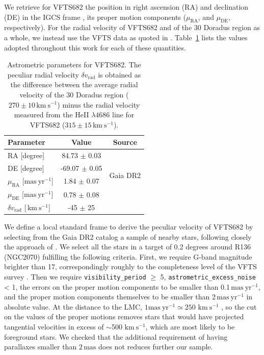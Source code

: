 \documentclass{aa}
\newcommand{\kms}{{\,\mathrm{km\ s^{-1}}}}
\DeclareRobustCommand{\Tabref}[1]{Table~\ref{#1}}
\begin{document}

We retrieve for VFTS682 the position in right ascension (RA) and declination (DE)
in the IGCS frame \cite[][]{brown:18}, its
proper motion components ($\mu_\mathrm{RA}$, and $\mu_\mathrm{DE}$,
respectively). For the radial velocity of VFTS682 and of the 30 Doradus
region as a whole, we instead use the VFTS data
as quoted in \cite{bestenlehner:11}. \Tabref{tab:vfts682} lists the values adopted throughout
this work for each of these quantities.

\begin{table}[tbp]
  \centering
    \caption{Astrometric parameters for VFTS682. The peculiar radial
    velocity $\delta v_\mathrm{rad}$ is obtained as the difference
    between the average radial velocity of the 30 Doradus region
    ($270\pm10\kms$) minus the radial velocity measured from the HeII $\lambda4686$
    line for VFTS682 ($315\pm15\kms$).}

  \begin{tabular}[htbp]{l|c|c}
    Parameter & Value & Source\\ \hline\hline
    RA \hfill[degree] &  \phantom{-}84.73 $\pm$  0.03 & \multirow{4}{*}{Gaia DR2}\\
    DE \hfill [degree] & -69.07 $\pm$  0.05  & \\
    $\mu_\mathrm{RA}$  \hfill[$\mathrm{mas\ yr^{-1}}$] & \phantom{-0}1.84 $\pm$ 0.07 & \\
    $\mu_\mathrm{DE}$  \hfill[$\mathrm{mas\ yr^{-1}}$] & \phantom{-0}0.78 $\pm$ 0.08& \\
    $\delta v_\mathrm{rad}$  \hfill[$\kms$] & \phantom{0}-45 $\pm$ 25 & \cite{bestenlehner:11}\\
    \hline
  \end{tabular}
  \label{tab:vfts682}
\end{table}

We define a local standard frame to derive the peculiar velocity
of VFTS682 by selecting from the Gaia DR2 catalog a sample of nearby
stars, following closely the approach of \cite{lennon:18}.
We select all the stars in a target of 0.2 degrees around R136
(NGC2070) fulfilling the following criteria. First, we require G-band
magnitude brighter than 17, correspondingly roughly to the
completeness level of the VFTS survey \citep[here we implicitly assume
G$\sim$V,][]{evans:11}. Then we require \texttt{visibility\_period} $\geq$ 5,
\texttt{astrometric\_excess\_noise} < 1, the errors on the proper
motion components to be smaller than 0.1\,$\mathrm{mas\ yr^{-1}}$,
and the proper motion components themselves to be smaller than
2\,$\mathrm{mas\ yr^{-1}}$ in absolute value. At the distance to the
LMC, $1\mathrm{mas\ yr^{-1}}\simeq250\,\kms$ \citep[e.g.,][]{lennon:18}, so the cut on the values
of the proper motions removes stars that would have projected
tangential velocities in excess of $\sim$500\,$\kms$, which are most
likely to be foreground stars. We checked that the additional
requirement of having parallaxes smaller than $2\,\mathrm{mas}$ does
not reduces further our sample. 
\end{document}
